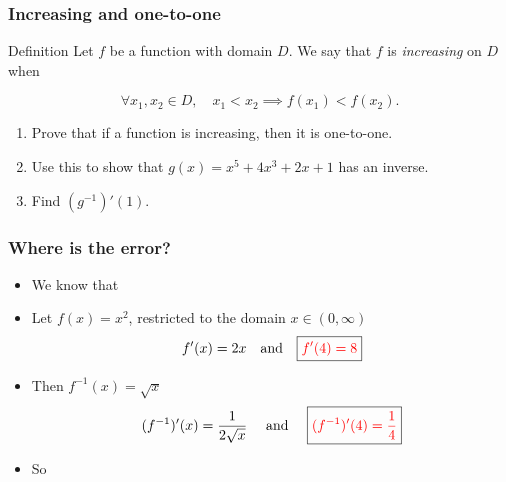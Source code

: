 \documentclass[14pt]{beamer}
\begin{document}
\begin{frame}[t]
	\frametitle{Increasing and one-to-one}

	\begin{block}{Definition}
		Let $f$ be a function with domain $D$. We say that $f$ is \emph{increasing} on
		$D$ when

		\[
			\forall x_{1}, x_{2}\in D, \quad x_{1}<x_{2}\implies f(x_{1})<f(x_{2}).
		\]
	\end{block}

	\begin{enumerate}
		\item Prove that if a function is increasing, then it is one-to-one.

		\item Use this to show that $g(x) = x^{5}+ 4x^{3}+ 2x + 1$ has an inverse.

		\item Find $(g^{-1})'(1)$.
	\end{enumerate}
\end{frame}

\begin{frame}[t]
	\frametitle{Where is the error?}

	\begin{itemize}
		\item We know that 

		\item Let $\displaystyle f(x) = x^{2}$, restricted to the domain
			$\displaystyle x \in (0, \infty)$
			\[
				f'(x) = 2x \quad \text{and}\quad \boxed{{\color{red} f'(4) = 8}}
			\]

		\item Then $\displaystyle f^{-1}(x) = \sqrt{x}$
			\[
				(f^{-1})'(x) = \frac{1}{2\sqrt{x}}\quad \text{ and }\quad \boxed{{\color{red} (f^{-1})'(4) = \frac{1}{4}}}
			\]

		\item So 
	\end{itemize}
\end{frame}
\end{document}
